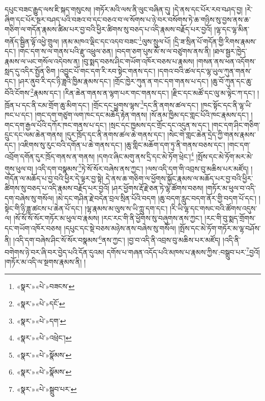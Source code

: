 དཔུང་བཟང་རྒྱུད་ལས་ཇི་སྐད་གསུངས། །གཏོར་མའི་ལས་ནི་ལུང་བཞིན་དུ། །དེ་ནས་དང་པོར་རབ་བཤད་བྱ། །རེ་ཞིག་དང་པོར་སྔར་བཤད་པའི་བཟའ་བ་དང་བཅའ་བ་ལ་སོགས་པ་ཉེ་བར་བསོགས་ཏེ་ཆ་གཉིས་སུ་བྱས་ནས་ཆ་གཅིག་ལ་གདོན་རྣམས་ཚིམ་པར་བྱ་བའི་ཕྱིར་ཚིགས་སུ་བཅད་པ་འདི་རྣམས་བརྗོད་པར་བྱའོ། །ལྷ་དང་ལྷ་མིན་གནོད་སྦྱིན་ལྟོ་འཕྱེ་གྲུལ། །ནམ་མཁའ་ལྡིང་དང་འདབ་བཟང་\footnote{«སྣར་»«པེ་»བཟངས་}ལུས་སྲུལ་པོ། །དྲི་ཟ་སྲིན་པོ་གདོན་གྱི་རིགས་རྣམས་དང་། །གང་དག་ས་ལ་གནས་པའི་རྫུ་འཕྲུལ་ཅན། །བདག་ཅག་པུས་མོ་ས་ལ་བཙུགས་ནས་ནི། །ཐལ་སྦྱར་ཁྱེད་རྣམས་ལ་ཡང་གསོལ་འདེབས་ན། །བུ་སྨད་བཅས་ཤིང་གཡོག་འཁོར་བཅས་པ་རྣམས། །གསན་ནས་ཕན་འདོགས་སླད་དུ་འདིར་སྤྱོན་ཅིག །འབྱུང་པོ་གང་དག་རི་རབ་སྟེང་གནས་དང་། །དགའ་བའི་ཚལ་དང་ལྷ་ཡུལ་ཀུན་གནས་དང་། །ཤར་ནུབ་རི་དང་ཉི་ཟླའི་ཁྱིམ་རྣམས་དང་། །གྲོང་ཁྱེར་ཀུན་ན་གང་དག་གནས་པ་དང་། །ཆུ་བོ་ཀུན་དང་ཆུ་བོའི་ངོགས་\footnote{«སྣར་»«པེ་»དངོ་}རྣམས་དང་། །རིན་ཆེན་གནས་ན་ལྷག་པར་གང་གནས་དང་། །རྫིང་དང་མཚོ་དང་ལུ་མ་ལྟེང་ཀ་དང་། །ཁྲོན་པ་དང་ནི་ངམ་གྲོག་ཆུ་མིག་དང་། །གྲོང་དང་ཕྱུགས་ལྷས་\footnote{«སྣར་»«པེ་»དག་}དང་ནི་ནགས་ཚལ་དང་། །ཁང་སྟོང་དང་ནི་ལྷ་ཡི་ཁང་པ་དང་། །གང་དག་གཙུག་ལག་ཁང་དང་མཆོད་རྟེན་གནས། །སོ་ནམ་ཁྱིམ་དང་གླང་པོའི་ཁང་རྣམས་དང་། །གང་དག་རྒྱལ་པོའི་དཀོར་ཁང་གནས་པ་དང་། །སྲང་དང་ཁྱམས་དང་གྲོང་དང་འདུན་ས་དང་། །གང་དག་ཤིང་གཅིག་དྲུང་དང་ལམ་ཆེན་གནས། །དུར་ཁྲོད་དང་ནི་ནགས་ཚལ་ཆེ་གནས་དང་། །སེང་གེ་གླང་ཆེན་དྲེད་ཀྱི་གནས་རྣམས་དང་། །འཇིགས་སུ་རུང་བའི་དགོན་པ་ཆེ་གནས་དང་། །ཆུ་གླིང་མཆོག་དག་ཏུ་ནི་གནས་བཅས་དང་། །གང་དག་འབྲོག་དགོན་དུར་ཁྲོད་གནས་ན་གནས། །དགའ་ཞིང་མགུ་ནས་དྲི་དང་མེ་ཏོག་ཕྲེང་།\footnote{«སྣར་»«པེ་»འཕྲེང་།} །སྤོས་དང་མེ་ཏོག་མར་མེ་གུས་ཕུལ་བ། །འདི་དག་བསྣམས་\footnote{«སྣར་»«པེ་»སྣོམས་}ཏེ་སོ་སོར་བཞེས་ནས་ཀྱང་། །ལས་འདི་དག་གི་འབྲས་བུ་མཆིས་པར་མཛོད། །གདོན་ལ་མཆོད་པ་བྱ་བའི་ཕྱིར་དེ་ལྟར་བྱ་སྟེ། དེ་ནས་ཆ་གཅིག་ལ་ཕྱོགས་སྐྱོང་རྣམས་ལ་མཆོད་པར་བྱ་བའི་ཕྱིར་ཚིགས་སུ་བཅད་པ་འདི་རྣམས་བརྗོད་པར་བྱའོ། །ཤར་ཕྱོགས་རྡོ་རྗེ་ཅན་ཏེ་ལྷ་ཚོགས་བཅས། །གཏོར་མ་ཕུལ་བ་འདི་དག་བཞེས་སུ་གསོལ། །མེ་དང་གཤིན་རྗེ་བདེན་བྲལ་སྲིན་པོའི་བདག །ཆུ་བདག་རླུང་བདག་ནོར་གྱི་བདག་པོ་དང་། །སྟེང་གི་ཉི་ཟླ་ཚངས་པ་ཆེན་པོ་དང་། །ལྷ་རྣམས་མ་ལུས་ས་ཡི་ཀླུ་དག་དང་། །རི་ཡི་ལྷ་དང་གསང་བའི་ཚོགས་འདུས་ལ། །སོ་སོ་སོ་སོར་གཏོར་མ་ཕུལ་བ་རྣམས། །རང་རང་གི་ནི་ཕྱོགས་སུ་བཞུགས་ནས་ཀྱང་། །རང་གི་བུ་སྨད་གྲོགས་དང་གཡོག་འཁོར་བཅས། །དཔུང་དང་སྡེ་བཅས་མཉེས་ནས་བཞེས་སུ་གསོལ། །སྤོས་དང་མེ་ཏོག་གཏོར་མ་ལྷ་བཤོས་ནི། །འདི་དག་བཞེས་ཤིང་སོ་སོར་བསྣམས་\footnote{«སྣར་»«པེ་»སྣོམས་}ནས་ཀྱང་། །བྱ་བ་འདི་ནི་འབྲས་བུ་མཆིས་པར་མཛོད། །འདི་ནི་བགེགས་ཉེ་བར་ཞི་བར་བྱེད་པའི་དོན་དུའམ། དགོས་པ་གཞན་འདོད་པའི་མཁས་པ་རྣམས་ཀྱིས་:བསྒྲུབ་པར་\footnote{«སྣར་»«པེ་»སྒྲུབ་པར་}བྱའོ། །གཏོར་མ་འདི་ལ་སྔགས་རྣམས་ནི། །
